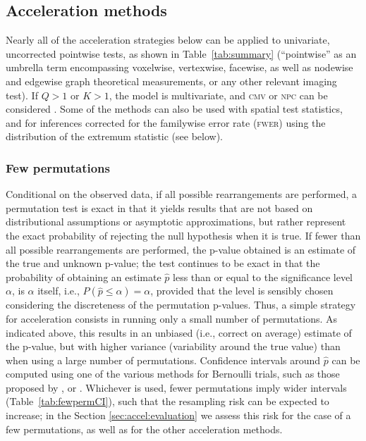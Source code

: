 \subsection{Acceleration methods}

Nearly all of the acceleration strategies below can be applied to univariate, uncorrected pointwise tests, as shown in Table~\ref{tab:summary} (``pointwise'' as an umbrella term encompassing voxelwise, vertexwise, facewise, as well as nodewise and edgewise graph theoretical measurements, or any other relevant imaging test). If $Q>1$ or $K>1$, the model is multivariate, and \textsc{cmv} or \textsc{npc} can be considered \citep{Winkler2016_npc}. Some of the methods can also be used with spatial test statistics, and for inferences corrected for the familywise error rate (\textsc{fwer}) using the distribution of the extremum statistic (see below).

\subsubsection{Few permutations}
\label{sec:accel:fewperms}

Conditional on the observed data, if all possible rearrangements are performed, a permutation test is exact in that it yields results that are not based on distributional assumptions or asymptotic approximations, but rather represent the exact probability of rejecting the null hypothesis when it is true. If fewer than all possible rearrangements are performed, the p-value obtained is an estimate of the true and unknown p-value; the test continues to be exact in that the probability of obtaining an estimate $\hat{p}$ less than or equal to the significance level $\alpha$, is $\alpha$ itself, i.e., $P(\hat{p}\leqslant\alpha)=\alpha$, provided that the level is sensibly chosen considering the discreteness of the permutation p-values. Thus, a simple strategy for acceleration consists in running only a small number of permutations. As indicated above, this results in an unbiased (i.e., correct on average) estimate of the p-value, but with higher variance (variability around the true value) than when using a large number of permutations. Confidence intervals around $\hat{p}$ can be computed using one of the various methods for Bernoulli trials, such as those proposed by \citet{Wilson1927}, \citet{Clopper1934} or \citet{Agresti1998} \citep[for a comparative review, see][]{Brown2001}. Whichever is used, fewer permutations imply wider intervals (Table~\ref{tab:fewpermCI}), such that the resampling risk can be expected to increase; in the Section \ref{sec:accel:evaluation} we assess this risk for the case of a few permutations, as well as for the other acceleration methods.

